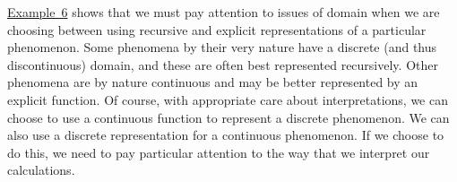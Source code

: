 \documentclass[10pt,]{book}
\theoremstyle{ptxdefinitionnotitle}
\theoremstyle{ptxdefinitiontitle}
\theoremstyle{ptxdefinitionnotitle}
\theoremstyle{ptxdefinitiontitle}
\theoremstyle{ptxdefinitionnotitle}
\theoremstyle{ptxdefinitiontitle}
\numberwithin{equation}{section}
\begin{document}
\hypertarget{p-107}{}%
\hyperref[example-continuous-discrete]{Example~6} shows that we must pay attention to issues of domain when we are choosing between using recursive and explicit representations of a particular phenomenon. Some phenomena by their very nature have a discrete (and thus discontinuous) domain, and these are often best represented recursively. Other phenomena are by nature continuous and may be better represented by an explicit function. Of course, with appropriate care about interpretations, we can choose to use a continuous function to represent a discrete phenomenon.  We can also use a discrete representation for a continuous phenomenon. If we choose to do this, we need to pay particular attention to the way that we interpret our calculations.%
\typeout{************************************************}
\typeout{************************************************}
\end{document}
